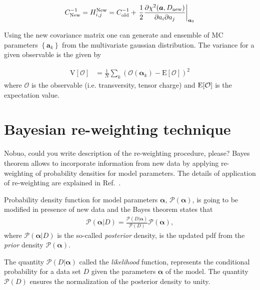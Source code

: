 \documentclass[twocolumn,showpacs,preprintnumbers,amsmath,amssymb,floatfix,prd]{revtex4}
\def\AP#1{{\color{blue} #1}}
\begin{document}
%
\begin{align}
C_{\rm New}^{-1}=
H^{\rm New}_{i,j}=
C_{\rm old}^{-1}
+
\left. \frac{1}{2}\frac{\partial\chi^2(\bm{a},D_{\rm new})}{\partial
a_i\partial a_j}
\right|_{\bm{a}_0}
\label{eq:Hnew}
\end{align}
%

Using the new covariance matrix one can generate and ensemble of MC
parameters $\left\{\bm{a}_k\right\}$ from the multivariate gaussian distribution.
The variance for a given observable is the given by 

%
\begin{align}
\text{V}[\mathcal{O}]
&=\frac{1}{N} \sum_k (\mathcal{O}(\bm{\alpha}_k)-\text{E}
[\mathcal{O}])^2 
\label{eq:Var}
\end{align}
%
where $\mathcal{O}$ is the observable (i.e. transversity, tensor
charge) and ${\rm E}[\mathcal{O}]$ is the expectation value.  






\section{Bayesian re-weighting technique}
%
\AP{Nobuo, could you write description of the re-weighting procedure, please?}
Bayes theorem allows to incorporate information from new data by applying re-weighting of probability densities for model parameters. The details of application of re-weighting are explained in Ref.~\cite{Sato:2013ika}.

Probability density function for model parameters $\bm{\alpha}$, $\mathcal{P}(\bm{\alpha})$, is going to be modified in presence of new data and the Bayes theorem states that 
%
\begin{align}
\mathcal{P}(\bm{\alpha}|D)
=\frac{\mathcal{P}(D|\bm{\alpha})}{\mathcal{P}(D)} \mathcal{P}(\bm{\alpha}),
\label{eq:bayes}
\end{align}
%
where $\mathcal{P}(\bm{\alpha}|D)$ is the so-called \emph{posterior} density, 
is the updated pdf from the \emph{prior} density 
$\mathcal{P}(\bm{\alpha})$.
 
The quantity $\mathcal{P}(D|\bm{\alpha})$ called the \emph{likelihood} 
function,
represents the conditional probability for a data set $D$ given the
parameters $\bm{\alpha}$ of the model.
The quantity $\mathcal{P}(D) $ ensures the normalization of the 
posterior density to unity.  
\end{document}
